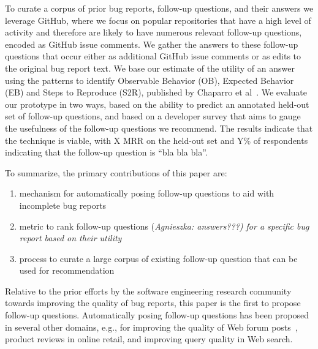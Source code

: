 To curate a corpus of prior bug reports, follow-up questions, and their answers we leverage GitHub, where we focus on popular repositories that have a high level of activity and therefore are likely to have numerous relevant follow-up questions, encoded as GitHub issue comments. We gather the answers to these follow-up questions that occur either as additional GitHub issue comments or as edits to the original bug report text. We base our estimate of the utility of an answer using the patterns to identify Observable Behavior (OB), Expected Behavior (EB) and Steps to Reproduce (S2R), published by Chaparro et al~\cite{chaparro17detecting}. We evaluate our prototype in two ways, based on the ability to predict an annotated held-out set of follow-up questions, and based on a developer survey that aims to gauge the usefulness of the follow-up questions we recommend. The results indicate that the technique is viable, with X MRR on the held-out set and Y\% of respondents indicating that the follow-up question is “bla bla bla”.

To summarize, the primary contributions of this paper are:
\begin{enumerate}
\item mechanism for automatically posing follow-up questions to aid with incomplete bug reports
\item metric to rank follow-up questions (\em Agnieszka: answers???) for a specific bug report based on their utility
\item process to curate a large corpus of existing follow-up question that can be used for recommendation
\end{enumerate}

Relative to the prior efforts by the software engineering research community towards improving the quality of bug reports, this paper is the first to propose follow-up questions. Automatically posing follow-up questions has been proposed in several other domains, e.g.,  for improving the quality of Web forum posts~\cite{rao-daume-iii-2018-learning}, product reviews in online retail, and improving query quality in Web search.

%
